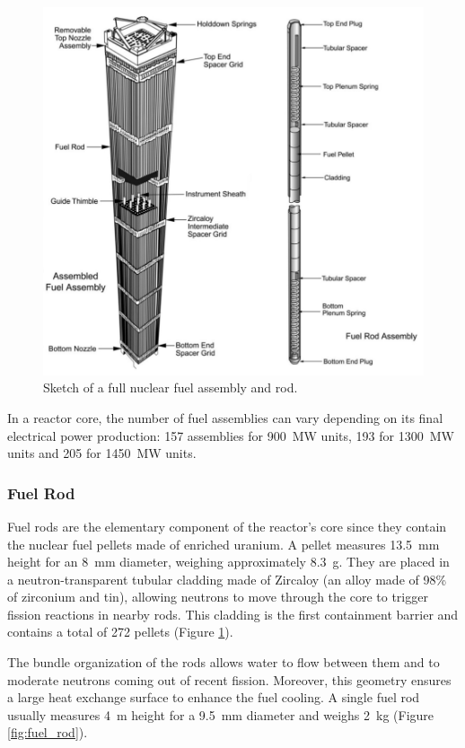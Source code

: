 \begin{figure}[!h]
\centering
\includegraphics[width=0.7\linewidth]{img/intro/fuel_assembly.png}
\caption{Sketch of a full nuclear fuel assembly and rod. \cite{croff_introduction_2008}}
\label{fig:fuel_assembly}
\end{figure}

\npar

In a reactor core, the number of fuel assemblies can vary depending on its final electrical power production: 157 assemblies for 900\ MW units, 193 for 1300~MW units and 205 for 1450~MW units.

\subsubsection{Fuel Rod}

Fuel rods are the elementary component of the reactor's core since they contain the nuclear fuel pellets made of enriched uranium. A pellet measures 13.5\ mm height for an 8\ mm diameter, weighing approximately 8.3\ g. They are placed in a neutron-transparent tubular cladding made of Zircaloy (an alloy made of 98\% of zirconium and tin), allowing neutrons to move through the core to trigger fission reactions in nearby rods. This cladding is the first containment barrier and contains a total of 272 pellets (Figure \ref{fig:fuel_assembly}).

\npar

The bundle organization of the rods allows water to flow between them and to moderate neutrons coming out of recent fission. Moreover, this geometry ensures a large heat exchange surface to enhance the fuel cooling. A single fuel rod usually measures 4\ m height for a 9.5\ mm diameter and weighs 2\ kg (Figure \ref{fig:fuel_rod}).


